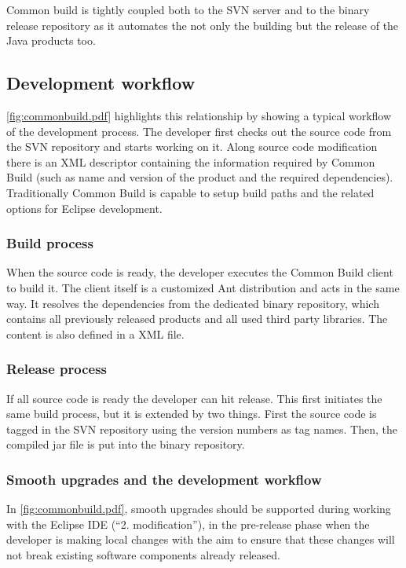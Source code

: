 Common build is tightly coupled both to the SVN server and to the binary release
repository as it automates the not only the building but the release of the
Java products too.

\subsection{Development workflow}
\autoref{fig:commonbuild.pdf} highlights this relationship by showing a typical
workflow of the development process. The developer first checks out the source
code from the SVN repository and starts working on it. Along source code
modification there is an XML descriptor containing the information required by
Common Build (such as name and version of the product and the required
dependencies). Traditionally Common Build is capable to setup build paths and the related
options for Eclipse development. 

\subsubsection{Build process}
When the source code is ready, the developer executes the Common Build client to
build it. The client itself is a customized Ant distribution and acts in the
same way. It resolves the dependencies from the dedicated binary repository,
which contains all previously released products and all used third party
libraries. The content is also defined in a XML file.

\subsubsection{Release process}
If all source code is ready the developer can hit release. This first initiates
the same build process, but it is extended by two things. First the source code
is tagged in the SVN repository using the version numbers as tag names. Then, the
compiled jar file is put into the binary repository. 

\subsubsection{Smooth upgrades and the development workflow}
In \autoref{fig:commonbuild.pdf}, smooth upgrades should be supported during working
with the Eclipse IDE (``2. modification''), in the pre-release phase when the
developer is making local changes with the aim to ensure that these changes will
not break existing software components already released.


